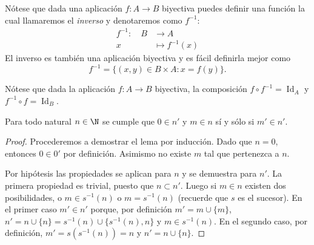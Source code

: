 \documentclass[11pt,oneside,a4paper]{book}
\DeclareMathOperator{\Id}{Id}
\begin{document}
Nótese que dada una aplicación $f:A\rightarrow B$ biyectiva puedes definir una función la cual llamaremos el \textit{inverso} y denotaremos como $f^{-1}$:
\begin{align*}
f^{-1}:\quad B&\longrightarrow A\\
x&\longmapsto f^{-1}(x)
\end{align*}
El inverso es también una aplicación biyectiva y es fácil definirla mejor como
$$
f^{-1}=\{(x,y)\in B\times A:x=f(y)\}.
$$
\begin{figure}
\centering
{}
\end{figure}

Nótese que dada la aplicación $f:A\rightarrow B$ biyectiva, la composición $f\circ f^{-1}=\Id_A$ y $f^{-1}\circ f=\Id_B$.
\begin{figure}
\centering
{}
\end{figure}

\begin{lem}
Para todo natural $n\in\N$ se cumple que $0\in n'$ y $m\in n$ sí y sólo si $m'\in n'$.
\end{lem}
\begin{proof}
Procederemos a demostrar el lema por inducción. Dado que $n=0$, entonces $0\in 0'$ por definición. Asimismo no existe $m$ tal que pertenezca a $n$.

Por hipótesis las propiedades se aplican para $n$ y se demuestra para $n'$. La primera propiedad es trivial, puesto que $n\subset n'$. Luego si $m\in n$ existen dos posibilidades, o $m\in s^{-1}(n)$ o $m=s^{-1}(n)$ (recuerde que $s$ es el sucesor). En el primer caso $m'\in n'$ porque, por definición $m'=m\cup\{m\}$, $n'=n\cup\{n\}=s^{-1}(n)\cup\{s^{-1}(n),n\}$ y $m\in s^{-1}(n)$. En el segundo caso, por definición, $m'=s(s^{-1}(n))=n$ y $n'=n\cup\{n\}$.
\end{proof}
\end{document}
